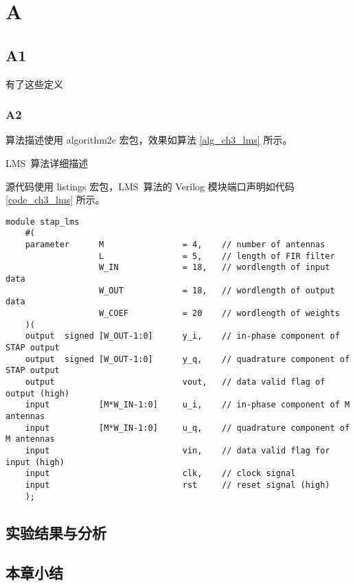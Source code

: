 
\chapter{A}

\section{A1}
有了这些定义

\subsection{A2}
算法描述使用 algorithm2e 宏包，效果如算法 \ref{alg_ch3_lms} 所示。

\normalem %
\begin{algorithm}[ht]
    \caption{LMS~算法详细描述}
    \label{alg_ch3_lms}
    \IncMargin{2em}
    \DontPrintSemicolon
\end{algorithm}
源代码使用 listings 宏包，LMS~算法的 Verilog 模块端口声明如代码 \ref{code_ch3_lms} 所示。

{
    \begin{lstlisting}[caption={空时~LMS~算法~Verilog~模块端口声明},label={code_ch3_lms}]
    module stap_lms
    #(
    parameter      M                = 4,    // number of antennas
                   L                = 5,    // length of FIR filter
                   W_IN             = 18,   // wordlength of input data
                   W_OUT            = 18,   // wordlength of output data
                   W_COEF           = 20    // wordlength of weights
    )(
    output  signed [W_OUT-1:0]      y_i,    // in-phase component of STAP output
    output  signed [W_OUT-1:0]      y_q,    // quadrature component of STAP output
    output                          vout,   // data valid flag of output (high)
    input          [M*W_IN-1:0]     u_i,    // in-phase component of M antennas
    input          [M*W_IN-1:0]     u_q,    // quadrature component of M antennas
    input                           vin,    // data valid flag for input (high)
    input                           clk,    // clock signal
    input                           rst     // reset signal (high)
    );
    \end{lstlisting}
}

\section{实验结果与分析}

\section{本章小结}
